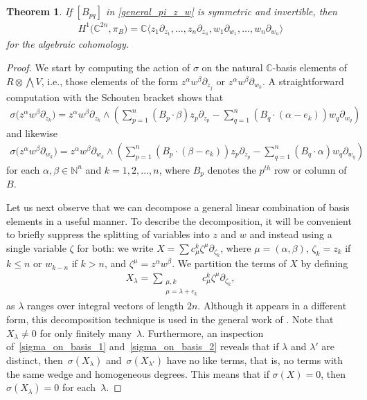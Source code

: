 \documentclass[pdftex]{sigma}
\numberwithin{equation}{section}
\newtheorem{Theorem}{Theorem}[section]
\begin{document}
\begin{Theorem}\label{BeritsH1theorem}
If $[B_{pq}]$ in \eqref{general_pi_z_w} is symmetric and invertible, then
\begin{gather*}
H^1\big({\mathbb C}^{2n},\pi_B\big)={\mathbb C}\langle z_1\partial_{z_1},\dots,z_n\partial_{z_n},w_1\partial_{w_1},\dots,w_n\partial_{w_n}\rangle
\end{gather*}
for the algebraic cohomology.
\end{Theorem}
\begin{proof}
We start by computing the action of $\sigma$ on the natural ${\mathbb C}$-basis elements of $R\otimes \bigwedge V$, i.e., those elements of the form $z^\alpha w^\beta\partial_{z_j}$ or $z^\alpha w^\beta \partial_{w_k}$. A straightforward computation with the Schouten bracket shows that
\begin{gather}\label{sigma_on_basis_1}
\sigma\big(z^\alpha w^\beta \partial_{z_k}\big)=z^\alpha w^\beta \partial_{z_k}\wedge\left(\sum_{p=1}^n (B_p\cdot\beta) z_p\partial_{z_p}-\sum_{q=1}^n (B_q\cdot (\alpha-e_k))w_q\partial_{w_q}\right)
\end{gather}
and likewise
\begin{gather}\label{sigma_on_basis_2}
\sigma\big(z^\alpha w^\beta \partial_{w_k}\big)=z^\alpha w^\beta \partial_{w_k}\wedge\left(\sum_{p=1}^n (B_p\cdot(\beta-e_k)) z_p\partial_{z_p}-\sum_{q=1}^n (B_q\cdot \alpha) w_q\partial_{w_q}\right)
\end{gather}
for each $\alpha,\beta\in\mathbb N^n$ and $k=1,2,\dots,n$, where $B_p$ denotes the $p^{th}$ row or column of $B$.

Let us next observe that we can decompose a general linear combination of basis elements in a useful manner. To describe the decomposition, it will be convenient to brief\/ly suppress the splitting of variables into $z$ and $w$ and instead using a single variable $\zeta$ for both: we write $X=\sum c_{\mu}^k \zeta^\mu\partial_{\zeta_k}$, where $\mu=(\alpha, \beta)$, $\zeta_k=z_k$ if $k\leq n$ or $w_{k-n}$ if $k>n$, and $\zeta^\mu=z^\alpha w^\beta$. We partition the terms of $X$ by def\/ining
\begin{gather*}
X_\lambda=\sum_{\substack{\mu, k\\ \mu=\lambda+e_k}} c_{\mu}^k \zeta^\mu \partial_{\zeta_k},
\end{gather*}
as $\lambda$ ranges over integral vectors of length $2n$. Although it appears in a dif\/ferent form, this decomposition technique is used in the general work of \cite{Monnier}. Note that $X_\lambda\ne 0$ for only f\/initely many~$\lambda$. Furthermore, an inspection of~\eqref{sigma_on_basis_1} and~\eqref{sigma_on_basis_2} reveals that if $\lambda$ and $\lambda'$ are distinct, then~$\sigma(X_{\lambda})$ and~$\sigma(X_{\lambda'})$ have no like terms, that is, no terms with the same wedge and homogeneous degrees. This means that if $\sigma(X)=0$, then $\sigma(X_\lambda)=0$ for each~$\lambda$.


\end{proof}
\end{document}
